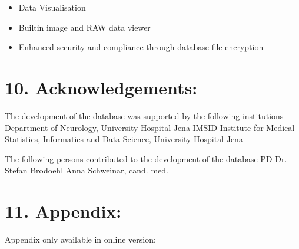 \documentclass[a4paper,10pt,english]{sphinxmanual}
\begin{document}
\sphinxAtStartPar
{}
\begin{itemize}
\item {} 
\sphinxAtStartPar
Data Visualisation

\item {} 
\sphinxAtStartPar
Built\sphinxhyphen{}in image and RAW data viewer

\item {} 
\sphinxAtStartPar
Enhanced security and compliance through database file encryption

\end{itemize}


\chapter{10. Acknowledgements:}
\label{\detokenize{TechnicalDetails:acknowledgements}}
\sphinxAtStartPar
The development of the database was supported by the following institutions
\sphinxhyphen{} Department of Neurology, University Hospital Jena
\sphinxhyphen{} IMSID \sphinxhyphen{} Institute for Medical Statistics, Informatics and Data Science, University Hospital Jena

\sphinxAtStartPar
The following persons contributed to the development of the database
\sphinxhyphen{} PD Dr. Stefan Brodoehl
\sphinxhyphen{} Anna Schweinar, cand. med.


\chapter{11. Appendix:}
\label{\detokenize{TechnicalDetails:appendix}}
\sphinxAtStartPar
Appendix only available in online version: 



\renewcommand{\indexname}{Index}
\printindex
\end{document}
